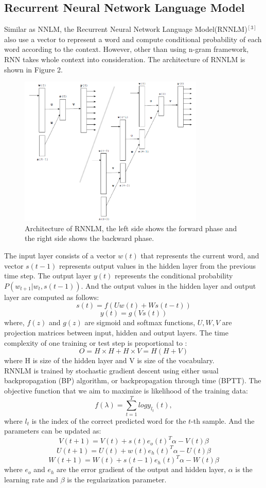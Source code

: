 \documentclass[11pt, oneside]{article}   	%
\begin{document}
\subsection{Recurrent Neural Network Language Model}

Similar as NNLM, the Recurrent Neural Network Language Model(RNNLM)$^{[3]}$ also use a vector to represent a word and compute conditional probability of each word according to the context. However, other than using n-gram framework, RNN takes whole context into consideration. The architecture of RNNLM is shown in Figure 2.

\begin{figure}[H]
\centering
\includegraphics[width=250pt]{rnnlm.png}
\caption{Architecture of RNNLM, the left side shows the forward phase and the right side shows the backward phase.}
\end{figure}
The input layer consists of a vector $w(t)$ that represents the current word, and vector $s(t-1)$ represents output values in the hidden layer from the previous time step. The output layer $y(t)$ represents the conditional probability $P(w_{t+1}|w_t, s(t-1)). $ And the output values in the hidden layer and output layer are computed as follows: 
\[
s(t)=f(Uw(t)+Ws(t-t))
\]
\[
y(t)=g(Vs(t))
\]
where, $f(z)$ and $g(z)$ are sigmoid and softmax functions, $U,W,V$ are projection matrices between input, hidden and output layers. 
The time complexity of one training or test step is proportional to :
\[
O=H\times H + H\times V = H(H+V)
\]
where H is size of the hidden layer and V is size of the vocabulary. \\

RNNLM is trained by stochastic gradient descent using either usual backpropagation (BP) algorithm, or backpropagation through time (BPTT). The objective function that we aim to maximize is likelihood of the training data:
\[
f(\lambda)=\sum_{t=1}^{T}logy_{l_{t}}(t),
\]
where $l_t$ is the index of the correct predicted word for the $t$-th sample. And the parameters can be updated as:
\[
V(t+1)=V(t)+s(t)e_o(t)^T\alpha-V(t)\beta
\]
\[
U(t+1)=U(t)+w(t)e_h(t)^T\alpha-U(t)\beta
\]
\[
W(t+1)=W(t)+s(t-1)e_h(t)^T\alpha-W(t)\beta
\]
where $e_o$ and $e_h$ are the error gradient of the output and hidden layer,  $\alpha$ is the learning rate and $\beta$ is the regularization parameter.
\end{document}
